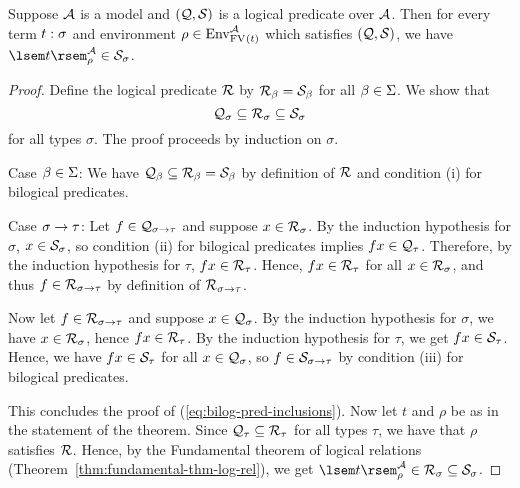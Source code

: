 \begin{thm} \label{thm:fundamental-thm-bilog-rel}
Suppose $\mathcal{A}$ is a model and $(\mathcal{Q}, \mathcal{S})$ is a logical predicate over $\mathcal{A}$. Then for every term $t : \sigma$ and environment $\rho \in \Env[\FV{t}][\struct{A}]$ which satisfies $(\mathcal{Q}, \mathcal{S})$, we have $\sint[\struct{A}]{t}{\rho} \in \scomp{\struct{S}}{\sigma}$.
\begin{proof}
Define the logical predicate $\mathcal{R}$ by $\mathcal{R}_{\beta} = \mathcal{S}_{\beta}$ for all $\beta \in \Sigma$. We show that
\begin{equation} \label{eq:bilog-pred-inclusions}
\mathcal{Q}_{\sigma} \subseteq \mathcal{R}_{\sigma} \subseteq \mathcal{S}_{\sigma}
\end{equation}
for all types $\sigma$. The proof proceeds by induction on $\sigma$.
\begin{items}
\item Case $\beta \in \Sigma$: We have $\mathcal{Q}_{\beta} \subseteq \mathcal{R}_{\beta} = \mathcal{S}_{\beta}$ by definition of $\mathcal{R}$ and condition (i) for bilogical predicates.

\item Case $\sigma \to \tau$: Let $f \in \mathcal{Q}_{\sigma \to \tau}$ and suppose $x \in \mathcal{R}_{\sigma}$. By the induction hypothesis for $\sigma$, $x \in \mathcal{S}_{\sigma}$, so condition (ii) for bilogical predicates implies $f x \in \mathcal{Q}_{\tau}$. Therefore, by the induction hypothesis for $\tau$, $f x \in \mathcal{R}_{\tau}$. Hence, $f x \in \mathcal{R}_{\tau}$ for all $x \in \mathcal{R}_{\sigma}$, and thus $f \in \mathcal{R}_{\sigma \to \tau}$ by definition of $\mathcal{R}_{\sigma \to \tau}$.

Now let $f \in \mathcal{R}_{\sigma \to \tau}$ and suppose $x \in \mathcal{Q}_{\sigma}$. By the induction hypothesis for $\sigma$, we have $x \in \mathcal{R}_{\sigma}$, hence $f x \in \mathcal{R}_{\tau}$. By the induction hypothesis for $\tau$, we get $f x \in \mathcal{S}_{\tau}$. Hence, we have $f x \in \mathcal{S}_{\tau}$ for all $x \in \mathcal{Q}_{\sigma}$, so $f \in \mathcal{S}_{\sigma \to \tau}$ by condition (iii) for bilogical predicates.
\end{items}
This concludes the proof of (\ref{eq:bilog-pred-inclusions}). Now let $t$ and $\rho$ be as in the statement of the theorem. Since $\mathcal{Q}_{\tau} \subseteq \mathcal{R}_{\tau}$ for all types $\tau$, we have that $\rho$ satisfies $\mathcal{R}$. Hence, by the Fundamental theorem of logical relations (Theorem~\ref{thm:fundamental-thm-log-rel}), we get $\sint[\struct{A}]{t}{\rho} \in \scomp{\struct{R}}{\sigma} \subs \scomp{\struct{S}}{\sigma}$.
\end{proof}
\end{thm}

